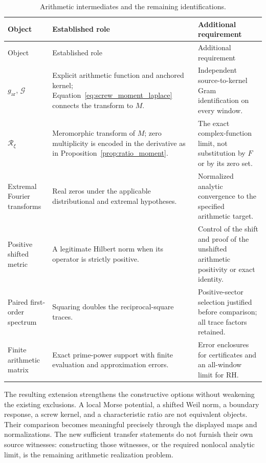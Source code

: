 \documentclass[11pt,letterpaper]{article}
\numberwithin{equation}{section}
\theoremstyle{definition}
\theoremstyle{remark}
\begin{document}
\begin{longtable}{P{0.25\textwidth}P{0.32\textwidth}P{0.34\textwidth}}
\caption{Arithmetic intermediates and the remaining identifications.}\label{tab:weil_status}\\
\toprule
Object & Established role & Additional requirement\\
\midrule
\endfirsthead
\toprule Object & Established role & Additional requirement\\\midrule
\endhead
$g_{\mathrm{ar}}$, $\mathscr G$ & Explicit arithmetic function and anchored kernel; Equation~\eqref{eq:screw_moment_laplace} connects the transform to $M$. & Independent source-to-kernel Gram identification on every window.\\
$\mathcal R_\xi$ & Meromorphic transform of $M$; zero multiplicity is encoded in the derivative as in Proposition~\ref{prop:ratio_moment}. & The exact complex-function limit, not substitution by $F$ or by its zero set.\\
Extremal Fourier transforms & Real zeros under the applicable distributional and extremal hypotheses. & Normalized analytic convergence to the specified arithmetic target.\\
Positive shifted metric & A legitimate Hilbert norm when its operator is strictly positive. & Control of the shift and proof of the unshifted arithmetic positivity or exact identity.\\
Paired first-order spectrum & Squaring doubles the reciprocal-square traces. & Positive-sector selection justified before comparison; all trace factors retained.\\
Finite arithmetic matrix & Exact prime-power support with finite evaluation and approximation errors. & Error enclosures for certificates and an all-window limit for RH.\\
\bottomrule
\end{longtable}

The resulting extension strengthens the constructive options without weakening the existing exclusions. A local Morse potential, a shifted Weil norm, a boundary response, a screw kernel, and a characteristic ratio are not equivalent objects. Their comparison becomes meaningful precisely through the displayed maps and normalizations. The new sufficient transfer statements do not furnish their own source witnesses: constructing those witnesses, or the required nonlocal analytic limit, is the remaining arithmetic realization problem.
\end{document}
